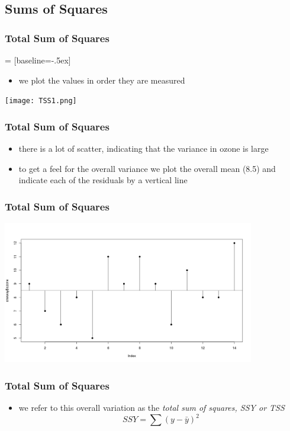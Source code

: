\subsection{Sums of Squares}
\begin{frame}\frametitle{Total Sum of Squares}
 = [baseline=-.5ex]
  \begin{itemize}
  \item  we plot the values in order they are measured
  \end{itemize}
\begin{center}
\texttt{[image: TSS1.png]}
\end{center}
\end{frame}

\begin{frame}\frametitle{Total Sum of Squares}
  \begin{itemize}
  \item  there is a lot of scatter, indicating that the variance in ozone is large
  \item to get a feel for the overall variance we plot the overall mean (8.5) and indicate each of the residuals by a vertical line
  \end{itemize}
\end{frame}

\begin{frame}\frametitle{Total Sum of Squares}
\begin{center}
\includegraphics[width=11cm]{img/TSS.png}
\end{center}
\end{frame}

\begin{frame}\frametitle{Total Sum of Squares}
  \begin{itemize}
  \item we refer to this overall variation as the \emph{total sum of squares, SSY or TSS} 
$$ SSY = \sum(y-\bar{y})^2$$
  \end{itemize}
\end{frame}

